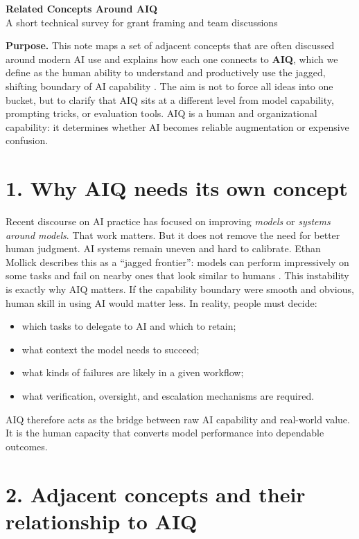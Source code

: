 \documentclass[10pt]{article}
\begin{document}
\begin{center}
{\LARGE \textbf{Related Concepts Around AIQ}}\\[0.25em]
{\large A short technical survey for grant framing and team discussions}
\end{center}

\textbf{Purpose.}
This note maps a set of adjacent concepts that are often discussed around modern AI use and explains how each one connects to \textbf{AIQ}, which we define as the human ability to understand and productively use the jagged, shifting boundary of AI capability \cite{sweldens2025aiq,sweldens2026stone}. The aim is not to force all ideas into one bucket, but to clarify that AIQ sits at a different level from model capability, prompting tricks, or evaluation tools. AIQ is a human and organizational capability: it determines whether AI becomes reliable augmentation or expensive confusion.

\section*{1. Why AIQ needs its own concept}

Recent discourse on AI practice has focused on improving \emph{models} or \emph{systems around models}. That work matters. But it does not remove the need for better human judgment. AI systems remain uneven and hard to calibrate. Ethan Mollick describes this as a ``jagged frontier'': models can perform impressively on some tasks and fail on nearby ones that look similar to humans \cite{mollick2023jagged}. This instability is exactly why AIQ matters. If the capability boundary were smooth and obvious, human skill in using AI would matter less. In reality, people must decide:

\begin{itemize}
\item which tasks to delegate to AI and which to retain;
\item what context the model needs to succeed;
\item what kinds of failures are likely in a given workflow;
\item what verification, oversight, and escalation mechanisms are required.
\end{itemize}

AIQ therefore acts as the bridge between raw AI capability and real-world value. It is the human capacity that converts model performance into dependable outcomes.

\section*{2. Adjacent concepts and their relationship to AIQ}
\end{document}
